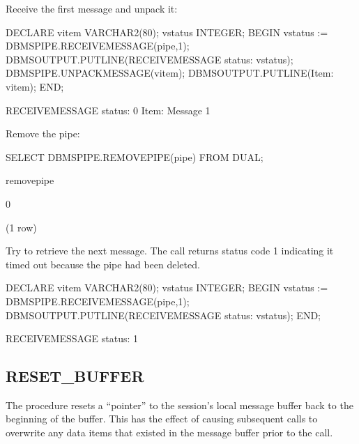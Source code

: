 \documentclass[letterpaper,10pt,english,openany,oneside]{sphinxmanual}
\begin{document}
Receive the first message and unpack it:

%
\begin{sphinxVerbatim}[commandchars=\\\{\}]
DECLARE
    v\PYGZus{}item          VARCHAR2(80);
    v\PYGZus{}status        INTEGER;
BEGIN
    v\PYGZus{}status := DBMS\PYGZus{}PIPE.RECEIVE\PYGZus{}MESSAGE(\PYGZsq{}pipe\PYGZsq{},1);
    DBMS\PYGZus{}OUTPUT.PUT\PYGZus{}LINE(\PYGZsq{}RECEIVE\PYGZus{}MESSAGE status: \PYGZsq{} \textbar{}\textbar{} v\PYGZus{}status);
    DBMS\PYGZus{}PIPE.UNPACK\PYGZus{}MESSAGE(v\PYGZus{}item);
    DBMS\PYGZus{}OUTPUT.PUT\PYGZus{}LINE(\PYGZsq{}Item: \PYGZsq{} \textbar{}\textbar{} v\PYGZus{}item);
END;

RECEIVE\PYGZus{}MESSAGE status: 0
Item: Message \PYGZsh{}1
\end{sphinxVerbatim}

\newpage

Remove the pipe:

%
\begin{sphinxVerbatim}[commandchars=\\\{\}]
SELECT DBMS\PYGZus{}PIPE.REMOVE\PYGZus{}PIPE(\PYGZsq{}pipe\PYGZsq{}) FROM DUAL;



remove\PYGZus{}pipe

\PYGZhy{}\PYGZhy{}\PYGZhy{}\PYGZhy{}\PYGZhy{}\PYGZhy{}\PYGZhy{}\PYGZhy{}\PYGZhy{}\PYGZhy{}\PYGZhy{}\PYGZhy{}\PYGZhy{}
          0

(1 row)
\end{sphinxVerbatim}

Try to retrieve the next message. The  call returns
status code 1 indicating it timed out because the pipe had been deleted.

%
\begin{sphinxVerbatim}[commandchars=\\\{\}]
DECLARE
    v\PYGZus{}item          VARCHAR2(80);
    v\PYGZus{}status        INTEGER;
BEGIN
    v\PYGZus{}status := DBMS\PYGZus{}PIPE.RECEIVE\PYGZus{}MESSAGE(\PYGZsq{}pipe\PYGZsq{},1);
    DBMS\PYGZus{}OUTPUT.PUT\PYGZus{}LINE(\PYGZsq{}RECEIVE\PYGZus{}MESSAGE status: \PYGZsq{} \textbar{}\textbar{} v\PYGZus{}status);
END;

RECEIVE\PYGZus{}MESSAGE status: 1
\end{sphinxVerbatim}

\newpage


\subsection{RESET\_BUFFER}
\label{\detokenize{reset_buffer::doc}}\label{\detokenize{reset_buffer:reset-buffer}}
The  procedure resets a “pointer” to the session’s local
message buffer back to the beginning of the buffer. This has the effect
of causing subsequent  calls to overwrite any data items
that existed in the message buffer prior to the  call.
\begin{quote}

\end{quote}
\end{document}
